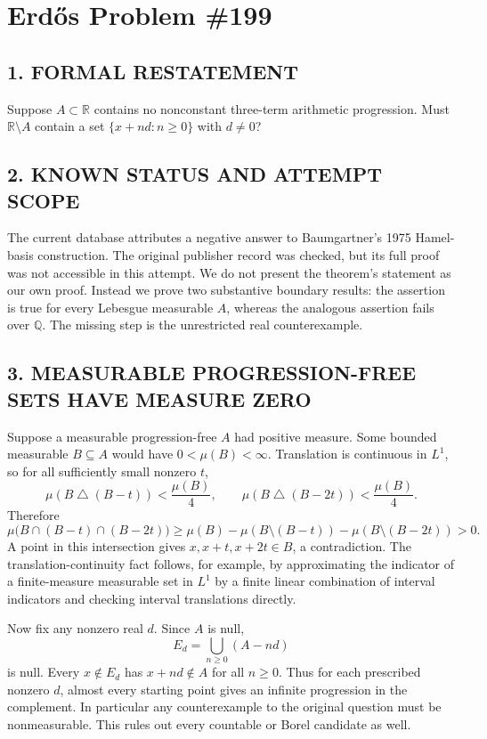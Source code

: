 \section{Erd\H{o}s Problem \#199}
\subsection*{1. FORMAL RESTATEMENT}
Suppose $A\subset\mathbb R$ contains no nonconstant three-term arithmetic progression. Must $\mathbb R\setminus A$ contain a set $\{x+nd:n\ge0\}$ with $d\ne0$?
\subsection*{2. KNOWN STATUS AND ATTEMPT SCOPE}
The current database attributes a negative answer to Baumgartner's 1975 Hamel-basis construction. The original publisher record was checked, but its full proof was not accessible in this attempt. We do not present the theorem's statement as our own proof. Instead we prove two substantive boundary results: the assertion is true for every Lebesgue measurable $A$, whereas the analogous assertion fails over $\mathbb Q$. The missing step is the unrestricted real counterexample.
\subsection*{3. MEASURABLE PROGRESSION-FREE SETS HAVE MEASURE ZERO}
Suppose a measurable progression-free $A$ had positive measure. Some bounded measurable $B\subseteq A$ would have $0<\mu(B)<\infty$. Translation is continuous in $L^1$, so for all sufficiently small nonzero $t$,
\[
 \mu(B\mathbin\triangle(B-t))<\frac{\mu(B)}4,
 \qquad
 \mu(B\mathbin\triangle(B-2t))<\frac{\mu(B)}4.
\]
Therefore
\[
 \mu\bigl(B\cap(B-t)\cap(B-2t)\bigr)
 \ge\mu(B)-\mu(B\setminus(B-t))-\mu(B\setminus(B-2t))>0.
\]
A point in this intersection gives $x,x+t,x+2t\in B$, a contradiction. The translation-continuity fact follows, for example, by approximating the indicator of a finite-measure measurable set in $L^1$ by a finite linear combination of interval indicators and checking interval translations directly.

Now fix any nonzero real $d$. Since $A$ is null,
\[
 E_d=\bigcup_{n\ge0}(A-nd)
\]
is null. Every $x\notin E_d$ has $x+nd\notin A$ for all $n\ge0$. Thus for each prescribed nonzero $d$, almost every starting point gives an infinite progression in the complement. In particular any counterexample to the original question must be nonmeasurable. This rules out every countable or Borel candidate as well.
